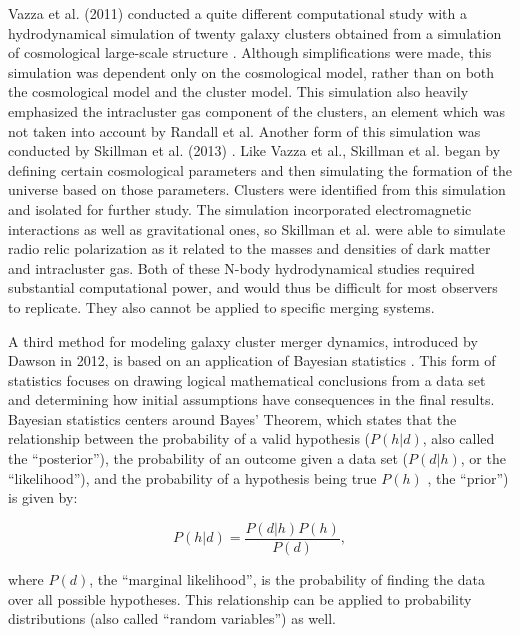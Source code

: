 \documentclass[12 pt]{article}
\renewcommand{\baselinestretch}{2}
\begin{document}
Vazza et al. (2011) conducted a quite different computational study with a hydrodynamical simulation of twenty galaxy clusters obtained from a simulation of cosmological large-scale structure \cite{Vazza11}. Although simplifications were made, this simulation was dependent only on the cosmological model, rather than on both the cosmological model and the cluster model. This simulation also heavily emphasized the intracluster gas component of the clusters, an element which was not taken into account by Randall et al. Another form of this simulation was conducted by Skillman et al. (2013) \cite{Skillman13}. Like Vazza et al., Skillman et al. began by defining certain cosmological parameters and then simulating the formation of the universe based on those parameters. Clusters were identified from this simulation and isolated for further study. The simulation incorporated electromagnetic interactions as well as gravitational ones, so Skillman et al. were able to simulate radio relic polarization as it related to the masses and densities of dark matter and intracluster gas. Both of these N-body hydrodynamical studies  required substantial computational power, and would thus be difficult for most observers to replicate. They also cannot be applied to specific merging systems.

A third method for modeling galaxy cluster merger dynamics, introduced by Dawson in 2012, is based on an application of Bayesian statistics \cite{Dawson13}. This form of statistics focuses on drawing logical mathematical conclusions from a data set and determining how initial assumptions have consequences in the final results. Bayesian statistics centers around Bayes' Theorem, which states that the relationship between the probability of a valid hypothesis ($P(h|d)$, also called the “posterior”), the probability of an outcome given a data set ($P(d|h)$, or the “likelihood”), and the probability of a hypothesis being true $P(h)$ , the “prior”) is given by: 

\renewcommand{\baselinestretch}{1}
\begin{equation}
\label{bayes}
P(h|d) = \frac{P(d|h) P(h)}{P(d)},
\end{equation}
\renewcommand{\baselinestretch}{2}

where $P(d)$, the “marginal likelihood”, is the probability of finding the data over all possible hypotheses. This relationship can be applied to probability distributions (also called “random variables”) as well.
\end{document}
